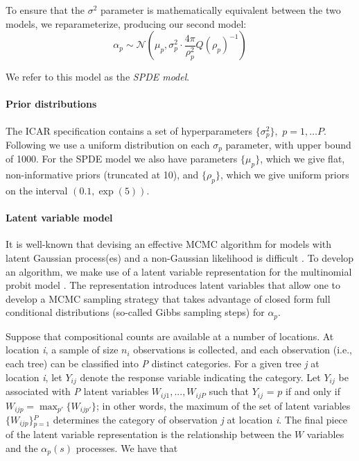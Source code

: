 \documentclass[10pt,letterpaper]{article}
\newcommand{\N}{\mathcal{N}}
\begin{document}
To ensure that the $\sigma^{2}$ parameter is mathematically equivalent
between the two models, we reparameterize, producing our second model:
\[
\alpha_{p}\sim\N\left(\mu_{p},\sigma_{p}^{2}\cdot\frac{4\pi}{\rho_{p}^{2}}Q(\rho_{p})^{-1}\right)
\]


We refer to this model as the \emph{SPDE model}.


\paragraph*{Prior distributions}

\noindent The ICAR specification contains a set of hyperparameters
$\{\sigma_{p}^{2}\},$ $p=1,\ldots P$. Following \cite{Gelm:2006}
we use a uniform distribution on each $\sigma_{p}$ parameter, with
upper bound of 1000. For the SPDE model we also have parameters $\{\mu_{p}\}$,
which we give flat, non-informative priors (truncated at 10),
and $\{\rho_{p}\}$, which we give uniform priors on the interval
$(0.1,\exp(5))$. 


\paragraph*{Latent variable model\label{sub:Latent-Variable-Model}}

It is well-known that devising an effective MCMC algorithm for models
with latent Gaussian process(es) and a non-Gaussian likelihood is
difficult \cite{Rue:Held:2005,Chri:etal:2006,Tan:Nott:2013}. To
develop an algorithm, we make use of a latent variable representation
for the multinomial probit model \cite{McCu:Ross:1994}. The representation
introduces latent variables that allow one to develop a MCMC sampling
strategy that takes advantage of closed form full conditional distributions
(so-called Gibbs sampling steps) for $\alpha_{p}$.

Suppose that compositional counts are available at a number of locations.
At location \emph{i}, a sample of size $n_{i}$ observations is collected,
and each observation (i.e., each tree) can be classified into \emph{P}
distinct categories. For a given tree \emph{j} at location \emph{i}, let $Y_{ij}$
denote the response variable indicating the category. Let $Y_{ij}$
be associated with \emph{P} latent variables $W_{ij1},...,W_{ijP}$ such
that $Y_{ij}$ = $p$ if and only if $W_{ijp}={\displaystyle \max_{p'}\big\{ W_{ijp'}\big\}}$;
in other words, the maximum of the set of latent variables $\{W_{ijp}\}{\displaystyle _{p=1}^{P}}$
determines the category of observation \emph{j} at location \emph{i}. The
final piece of the latent variable representation is the relationship
between the $W$ variables and the $\alpha_{p}(s)$ processes. We
have that
\end{document}
